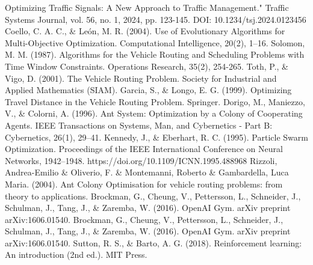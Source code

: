 \newline[13]Optimizing Traffic Signals: A New Approach to Traffic Management." Traffic Systems Journal, vol. 56, no. 1, 2024, pp. 123-145. DOI: 10.1234/tsj.2024.0123456
\newline[14]Coello, C. A. C., \& León, M. R. (2004). Use of Evolutionary Algorithms for Multi-Objective Optimization. Computational Intelligence, 20(2), 1–16.
\newline[15]Solomon, M. M. (1987). Algorithms for the Vehicle Routing and Scheduling Problems with Time Window Constraints. Operations Research, 35(2), 254-265.
\newline[16]Toth, P., \& Vigo, D. (2001). The Vehicle Routing Problem. Society for Industrial and Applied Mathematics (SIAM).
\newline[17]Garcia, S., \& Longo, E. G. (1999). Optimizing Travel Distance in the Vehicle Routing Problem. Springer.
\newline[18]Dorigo, M., Maniezzo, V., \& Colorni, A. (1996). Ant System: Optimization by a Colony of Cooperating Agents. IEEE Transactions on Systems, Man, and Cybernetics - Part B: Cybernetics, 26(1), 29–41.
\newline[19]Kennedy, J., \& Eberhart, R. C. (1995). Particle Swarm Optimization. Proceedings of the IEEE International Conference on Neural Networks, 1942–1948. https://doi.org/10.1109/ICNN.1995.488968
\newline[20] Rizzoli, Andrea-Emilio \& Oliverio, F. \& Montemanni, Roberto \& Gambardella, Luca Maria. (2004). Ant Colony Optimisation for vehicle routing problems: from theory to applications. 
\newline[21]Brockman, G., Cheung, V., Pettersson, L., Schneider, J., Schulman, J., Tang, J., \& Zaremba, W. (2016). OpenAI Gym. arXiv preprint arXiv:1606.01540.
\newline[22]Brockman, G., Cheung, V., Pettersson, L., Schneider, J., Schulman, J., Tang, J., \& Zaremba, W. (2016). OpenAI Gym. arXiv preprint arXiv:1606.01540.
\newline[23]Sutton, R. S., \& Barto, A. G. (2018). Reinforcement learning: An introduction (2nd ed.). MIT Press.


